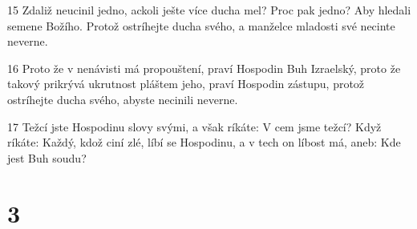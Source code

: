 \par 15 Zdaliž neucinil jedno, ackoli ješte více ducha mel? Proc pak jedno? Aby hledali semene Božího. Protož ostríhejte ducha svého, a manželce mladosti své necinte neverne.
\par 16 Proto že v nenávisti má propouštení, praví Hospodin Buh Izraelský, proto že takový prikrývá ukrutnost pláštem jeho, praví Hospodin zástupu, protož ostríhejte ducha svého, abyste necinili neverne.
\par 17 Težcí jste Hospodinu slovy svými, a však ríkáte: V cem jsme težcí? Když ríkáte: Každý, kdož ciní zlé, líbí se Hospodinu, a v tech on líbost má, aneb: Kde jest Buh soudu?

\chapter{3}

